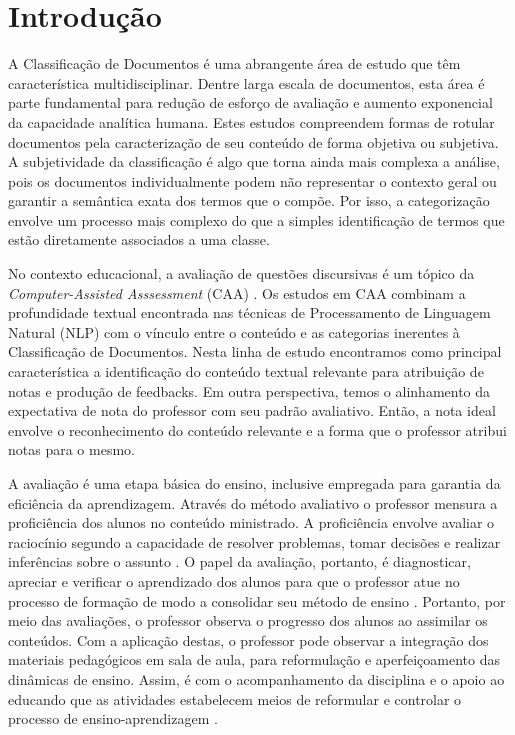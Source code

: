 \chapter{Introdução}
\label{cap1-intro}

A Classificação de Documentos é uma abrangente área de estudo que têm característica multidisciplinar. Dentre larga escala de documentos, esta área é parte fundamental para redução de esforço de avaliação e aumento exponencial da capacidade analítica humana. Estes estudos compreendem formas de rotular documentos pela caracterização de seu conteúdo de forma objetiva ou subjetiva. A subjetividade da classificação é algo que torna ainda mais complexa a análise, pois os documentos individualmente podem não representar o contexto geral ou garantir a semântica exata dos termos que o compõe. Por isso, a categorização envolve um processo mais complexo do que a simples identificação de termos que estão diretamente associados a uma classe.

No contexto educacional, a avaliação de questões discursivas é um tópico da \textit{Computer-Assisted Asssessment} (CAA) \cite{bogarin2018}. Os estudos em CAA combinam a profundidade textual encontrada nas técnicas de Processamento de Linguagem Natural (NLP) com o vínculo entre o conteúdo e as categorias inerentes à Classificação de Documentos. Nesta linha de estudo encontramos como principal característica a identificação do conteúdo textual relevante para atribuição de notas e produção de feedbacks. Em outra perspectiva, temos o alinhamento da expectativa de nota do professor com seu padrão avaliativo. Então, a nota ideal envolve o reconhecimento do conteúdo relevante e a forma que o professor atribui notas para o mesmo. 

A avaliação é uma etapa básica do ensino, inclusive empregada para garantia da eficiência da aprendizagem. Através do método avaliativo o professor mensura a proficiência dos alunos no conteúdo ministrado. A proficiência envolve avaliar o raciocínio segundo a capacidade de resolver problemas, tomar decisões e realizar inferências sobre o assunto \cite{casiraghi2017}. O papel da avaliação, portanto, é diagnosticar, apreciar e verificar o aprendizado dos alunos para que o professor atue no processo de formação de modo a consolidar seu método de ensino \cite{oliveira2005}. Portanto, por meio das avaliações, o professor observa o progresso dos alunos ao assimilar os conteúdos. Com a aplicação destas, o professor pode observar a integração dos materiais pedagógicos em sala de aula, para reformulação e aperfeiçoamento das dinâmicas de ensino. Assim, é com o acompanhamento da disciplina e o apoio ao educando que as atividades estabelecem meios de reformular e controlar o processo de ensino-aprendizagem \cite{barreira2006}.

